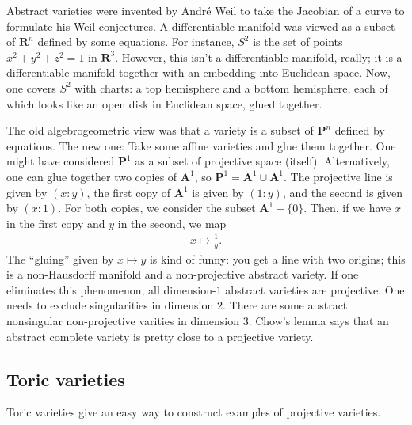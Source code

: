 \documentclass [11 pt, oneside, margin = 1 in] {article}
\begin{document}
Abstract varieties were invented by Andr\'e Weil to take the Jacobian of a curve to formulate his Weil conjectures. A differentiable manifold was viewed as a subset of $\mathbf{R}^n$ defined by some equations. For instance, $S^2$ is the set of points $x^2+y^2+z^2=1$ in $\mathbf{R}^3$. However, this isn't a differentiable manifold, really; it is a differentiable manifold together with an embedding into Euclidean space. Now, one covers $S^2$ with charts: a top hemisphere and a bottom hemisphere, each of which looks like an open disk in Euclidean space, glued together. 

The old algebrogeometric view was that a variety is a subset of $\mathbf{P}^n$ defined by equations. The new one: Take some affine varieties and glue them together. One might have considered $\mathbf{P}^1$ as a subset of projective space (itself). Alternatively, one can glue together two copies of $\mathbf{A}^1$, so $\mathbf{P}^1=\mathbf{A}^1\cup \mathbf{A}^1$. The projective line is given by $(x:y)$, the first copy of $\mathbf{A}^1$ is given by $(1:y)$, and the second is given by $(x:1)$. For both copies, we consider the subset $\mathbf{A}^1-\{0\}$. Then, if we have $x$ in the first copy and $y$ in the second, we map 
\begin{align*}
	x\longmapsto \frac{1}{y}.
\end{align*}
The ``gluing'' given by $x\longmapsto y$ is kind of funny: you get a line with two origins; this is a non-Hausdorff manifold and a non-projective abstract variety. If one eliminates this phenomenon, all dimension-$1$ abstract varieties are projective. One needs to exclude singularities in dimension $2$. There are some abstract nonsingular non-projective varities in dimension $3$. Chow's lemma says that an abstract complete variety is pretty close to a projective variety. 

\subsection{Toric varieties}
Toric varieties give an easy way to construct examples of projective varieties.
\end{document}
